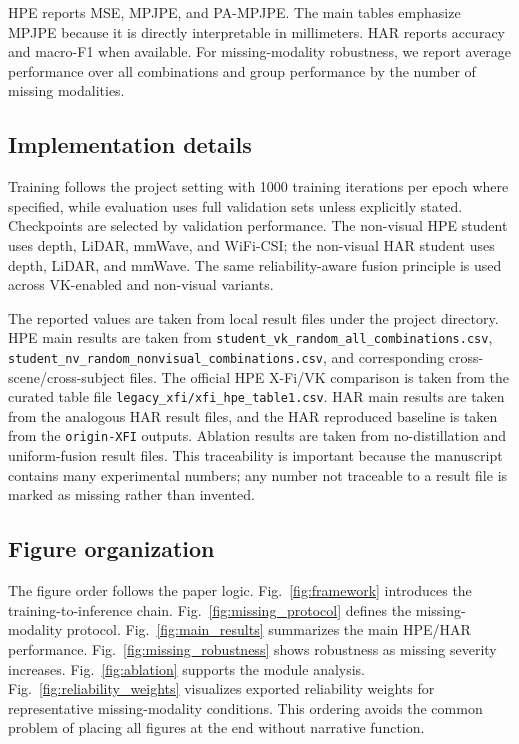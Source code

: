 \documentclass[preprint,12pt]{elsarticle}
\newcommand{\mpjpe}{MPJPE}
\newcommand{\pampjpe}{PA-MPJPE}
\begin{document}
HPE reports MSE, \mpjpe{}, and \pampjpe{}. The main tables emphasize \mpjpe{} because it is directly interpretable in millimeters. HAR reports accuracy and macro-F1 when available. For missing-modality robustness, we report average performance over all combinations and group performance by the number of missing modalities.

\subsection{Implementation details}

Training follows the project setting with 1000 training iterations per epoch where specified, while evaluation uses full validation sets unless explicitly stated. Checkpoints are selected by validation performance. The non-visual HPE student uses depth, LiDAR, mmWave, and WiFi-CSI; the non-visual HAR student uses depth, LiDAR, and mmWave. The same reliability-aware fusion principle is used across VK-enabled and non-visual variants.

The reported values are taken from local result files under the project directory. HPE main results are taken from \texttt{student\_vk\_random\_all\_combinations.csv}, \texttt{student\_nv\_random\_nonvisual\_combinations.csv}, and corresponding cross-scene/cross-subject files. The official HPE X-Fi/VK comparison is taken from the curated table file \texttt{legacy\_xfi/xfi\_hpe\_table1.csv}. HAR main results are taken from the analogous HAR result files, and the HAR reproduced baseline is taken from the \texttt{origin-XFI} outputs. Ablation results are taken from no-distillation and uniform-fusion result files. This traceability is important because the manuscript contains many experimental numbers; any number not traceable to a result file is marked as missing rather than invented.

\subsection{Figure organization}

The figure order follows the paper logic. Fig.~\ref{fig:framework} introduces the training-to-inference chain. Fig.~\ref{fig:missing_protocol} defines the missing-modality protocol. Fig.~\ref{fig:main_results} summarizes the main HPE/HAR performance. Fig.~\ref{fig:missing_robustness} shows robustness as missing severity increases. Fig.~\ref{fig:ablation} supports the module analysis. Fig.~\ref{fig:reliability_weights} visualizes exported reliability weights for representative missing-modality conditions. This ordering avoids the common problem of placing all figures at the end without narrative function.
\end{document}
